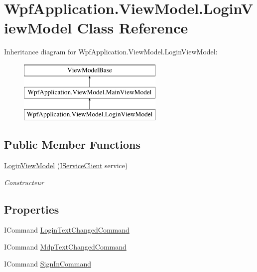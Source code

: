 \hypertarget{class_wpf_application_1_1_view_model_1_1_login_view_model}{\section{Wpf\-Application.\-View\-Model.\-Login\-View\-Model Class Reference}
\label{class_wpf_application_1_1_view_model_1_1_login_view_model}
}
Inheritance diagram for Wpf\-Application.\-View\-Model.\-Login\-View\-Model\-:\begin{figure}[H]
\begin{center}
\leavevmode
\includegraphics[height=3.000000cm]{class_wpf_application_1_1_view_model_1_1_login_view_model}
\end{center}
\end{figure}
\subsection*{Public Member Functions}
\begin{DoxyCompactItemize}
\item 
\hyperlink{class_wpf_application_1_1_view_model_1_1_login_view_model_afe8708360a4ee79d5ee9662a64d17140}{Login\-View\-Model} (\hyperlink{interface_wpf_application_1_1_model_1_1_i_service_client}{I\-Service\-Client} service)
\begin{DoxyCompactList}\small\item\em Constructeur \end{DoxyCompactList}\end{DoxyCompactItemize}
\subsection*{Properties}
\begin{DoxyCompactItemize}
\item 
I\-Command \hyperlink{class_wpf_application_1_1_view_model_1_1_login_view_model_ae38da2719079c1cd5e7b490b2f148da7}{Login\-Text\-Changed\-Command}
\item 
I\-Command \hyperlink{class_wpf_application_1_1_view_model_1_1_login_view_model_ada946f5d652607c5bc0ee7304448521e}{Mdp\-Text\-Changed\-Command}
\item 
I\-Command \hyperlink{class_wpf_application_1_1_view_model_1_1_login_view_model_abc7d5ebea644ef08fa0ce5c8507b3403}{Sign\-In\-Command}
\end{DoxyCompactItemize}


